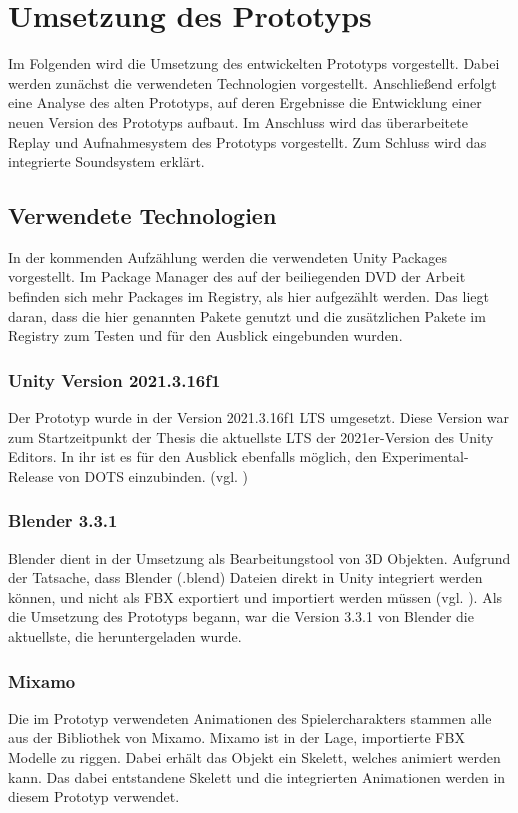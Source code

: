 \chapter{Umsetzung des Prototyps}\label{sec:dev}
Im Folgenden wird die Umsetzung des entwickelten Prototyps vorgestellt. Dabei werden zunächst die verwendeten Technologien vorgestellt. Anschließend erfolgt eine Analyse des alten Prototyps, auf deren Ergebnisse die Entwicklung einer neuen Version des Prototyps aufbaut. Im Anschluss wird das überarbeitete Replay und Aufnahmesystem des Prototyps vorgestellt. Zum Schluss wird das integrierte Soundsystem erklärt.

\section{Verwendete Technologien}
In der kommenden Aufzählung werden die verwendeten Unity Packages vorgestellt. Im Package Manager des auf der beiliegenden \ac{DVD} der Arbeit befinden sich mehr Packages im Registry, als hier aufgezählt werden. Das liegt daran, dass die hier genannten Pakete genutzt und die zusätzlichen Pakete im Registry zum Testen und für den Ausblick eingebunden wurden.

\subsection{Unity Version 2021.3.16f1}
Der Prototyp wurde in der Version 2021.3.16f1 \ac{LTS} umgesetzt. Diese Version war zum Startzeitpunkt der Thesis die aktuellste \ac{LTS} der 2021er-Version des Unity Editors. In ihr ist es für den Ausblick ebenfalls möglich, den Experimental-Release von \ac{DOTS} einzubinden. 
(vgl. \cite{noauthor_official_nodate})

\subsection{Blender 3.3.1}
Blender dient in der Umsetzung als Bearbeitungstool von \ac{3D} Objekten. Aufgrund der Tatsache, dass Blender (.blend) Dateien direkt in Unity integriert werden können, und nicht als \ac{FBX} exportiert und importiert werden müssen (vgl. \cite{technologies_unity_nodate}). Als die Umsetzung des Prototyps begann, war die Version 3.3.1 von Blender die aktuellste, die heruntergeladen wurde.

\subsection{Mixamo}
Die im Prototyp verwendeten Animationen des Spielercharakters stammen alle aus der Bibliothek von Mixamo. Mixamo ist in der Lage, importierte \ac{FBX} Modelle zu riggen. Dabei erhält das Objekt ein Skelett, welches animiert werden kann. Das dabei entstandene Skelett und die integrierten Animationen werden in diesem Prototyp verwendet.

